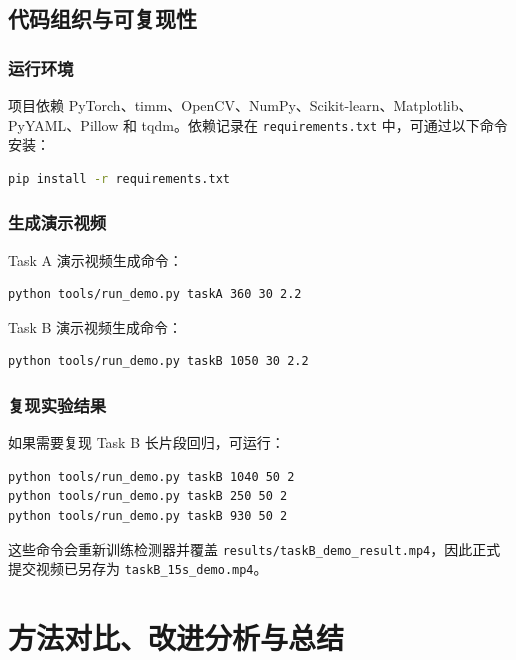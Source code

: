 \documentclass[12pt,hyperref,a4paper,UTF8,fontset=fandol]{ctexart}
\begin{document}
\newpage
\subsection{代码组织与可复现性}

\subsubsection{运行环境}

项目依赖 PyTorch、timm、OpenCV、NumPy、Scikit-learn、Matplotlib、PyYAML、Pillow 和 tqdm。依赖记录在 \texttt{requirements.txt} 中，可通过以下命令安装：

\begin{lstlisting}[language=bash]
pip install -r requirements.txt
\end{lstlisting}

\subsubsection{生成演示视频}

Task A 演示视频生成命令：

\begin{lstlisting}[language=bash]
python tools/run_demo.py taskA 360 30 2.2
\end{lstlisting}

Task B 演示视频生成命令：

\begin{lstlisting}[language=bash]
python tools/run_demo.py taskB 1050 30 2.2
\end{lstlisting}

\subsubsection{复现实验结果}

如果需要复现 Task B 长片段回归，可运行：

\begin{lstlisting}[language=bash]
python tools/run_demo.py taskB 1040 50 2
python tools/run_demo.py taskB 250 50 2
python tools/run_demo.py taskB 930 50 2
\end{lstlisting}

这些命令会重新训练检测器并覆盖 \texttt{results/taskB\_demo\_result.mp4}，因此正式提交视频已另存为 \texttt{taskB\_15s\_demo.mp4}。

\newpage
\section{方法对比、改进分析与总结}
\end{document}
